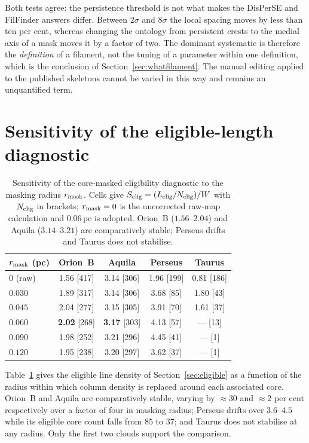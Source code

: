 \documentclass[usenatbib,twoside,twocolumn]{mnras}
\begin{document}
\smallskip\noindent Both tests agree: the persistence threshold is not what makes the DisPerSE and FilFinder answers differ. Between $2\sigma$ and $8\sigma$ the local spacing moves by less than ten per cent, whereas changing the ontology from persistent crests to the medial axis of a mask moves it by a factor of two. The dominant systematic is therefore the \emph{definition} of a filament, not the tuning of a parameter within one definition, which is the conclusion of Section~\ref{sec:whatfilament}. The manual editing applied to the published skeletons cannot be varied in this way and remains an unquantified term.


\section{Sensitivity of the eligible-length diagnostic}
\label{sec:maskapp}

\begin{table}
\caption{Sensitivity of the core-masked eligibility diagnostic to the masking radius $r_{\rm mask}$. Cells give $S_{\rm elig}=(L_{\rm elig}/N_{\rm elig})/W$ with $N_{\rm elig}$ in brackets; $r_{\rm mask}=0$ is the uncorrected raw-map calculation and $0.06$\,pc is adopted. Orion~B ($1.56$--$2.04$) and Aquila ($3.14$--$3.21$) are comparatively stable; Perseus drifts and Taurus does not stabilise.}
\label{tab:maskrad}
\footnotesize
\setlength{\tabcolsep}{4pt}
\begin{tabular}{lcccc}
\toprule
$r_{\rm mask}$ (pc) & Orion~B & Aquila & Perseus & Taurus \\
\midrule
$0$ (raw) & 1.56 [417] & 3.14 [306] & 1.96 [199] & 0.81 [186] \\
$0.030$   & 1.89 [317] & 3.14 [306] & 3.68 [85]  & 1.80 [43] \\
$0.045$   & 2.04 [277] & 3.15 [305] & 3.91 [70]  & 1.61 [37] \\
$0.060$   & \textbf{2.02} [268] & \textbf{3.17} [303] & 4.13 [57] & --- [13] \\
$0.090$   & 1.98 [252] & 3.21 [296] & 4.45 [41]  & --- [1] \\
$0.120$   & 1.95 [238] & 3.20 [297] & 3.62 [37]  & --- [1] \\
\bottomrule
\end{tabular}
\end{table}

Table~\ref{tab:maskrad} gives the eligible line density of Section~\ref{sec:eligible} as a function of the radius within which column density is replaced around each associated core. Orion~B and Aquila are comparatively stable, varying by $\approx30$ and $\approx2$ per cent respectively over a factor of four in masking radius; Perseus drifts over $3.6$--$4.5$ while its eligible core count falls from $85$ to $37$; and Taurus does not stabilise at any radius. Only the first two clouds support the comparison.
\end{document}
